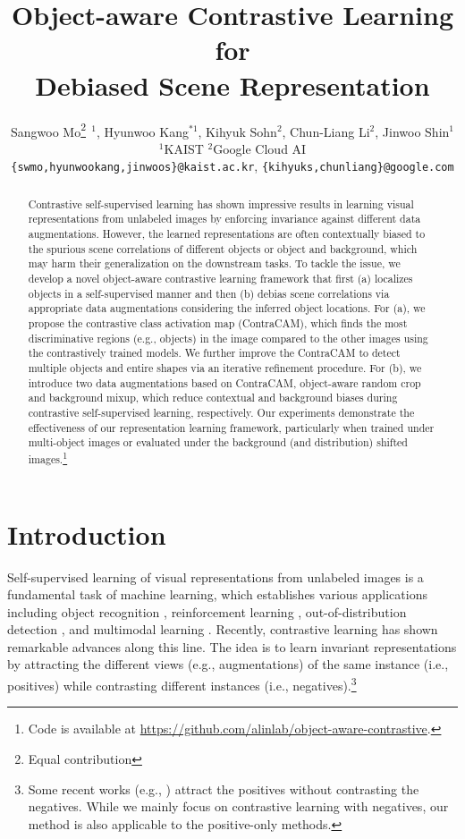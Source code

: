 \documentclass{article}
\title{
Object-aware Contrastive Learning for \\
Debiased Scene Representation
}
\author{%
Sangwoo Mo\thanks{Equal contribution}$\:\:^1$, Hyunwoo Kang$^{*1}$, Kihyuk Sohn$^2$, Chun-Liang Li$^2$, Jinwoo Shin$^1$\\
$^1$KAIST \quad $^2$Google Cloud AI\\
\texttt{\{swmo,hyunwookang,jinwoos\}@kaist.ac.kr}, \texttt{\{kihyuks,chunliang\}@google.com}
}
\begin{document}
\maketitle
  
\setcounter{footnote}{0}

\begin{abstract}
 Contrastive self-supervised learning has shown impressive results in learning visual representations from unlabeled images by enforcing invariance against different data augmentations. However, the learned representations are often contextually biased to the spurious scene correlations of different objects or object and background, which may harm their generalization on the downstream tasks. To tackle the issue, we develop a novel object-aware contrastive learning framework that first (a) localizes objects in a self-supervised manner and then (b) debias scene correlations via appropriate data augmentations considering the inferred object locations. For (a), we propose the contrastive class activation map (ContraCAM), which finds the most discriminative regions (e.g., objects) in the image compared to the other images using the contrastively trained models. We further improve the ContraCAM to detect multiple objects and entire shapes via an iterative refinement procedure. For (b), we introduce two data augmentations based on ContraCAM, object-aware random crop and background mixup, which reduce contextual and background biases during contrastive self-supervised learning, respectively. Our experiments demonstrate the effectiveness of our representation learning framework, particularly when trained under multi-object images or evaluated under the background (and distribution) shifted images.\footnote{Code is available at \url{https://github.com/alinlab/object-aware-contrastive}.}
\end{abstract}


\section{Introduction}
\label{sec:intro}

Self-supervised learning of visual representations from unlabeled images is a fundamental task of machine learning, which establishes various applications including object recognition \citep{he2020momentum,chen2020simple}, reinforcement learning \citep{anand2019unsupervised,srinivas2020curl}, out-of-distribution detection \citep{tack2020csi,sohn2021learning}, and multimodal learning \citep{radford2021learning,afouras2021self}. Recently, contrastive learning \citep{oord2018representation,wu2018unsupervised,misra2020self,he2020momentum,chen2020simple,caron2020unsupervised,tian2020contrastive,grill2020bootstrap,chen2021exploring} has shown remarkable advances along this line. The idea is to learn invariant representations by attracting the different views (e.g., augmentations) of the same instance (i.e., positives) while contrasting different instances (i.e., negatives).\footnote{Some recent works (e.g., \citep{grill2020bootstrap,chen2021exploring}) attract the positives without contrasting the negatives. While we mainly focus on contrastive learning with negatives, our method is also applicable to the positive-only methods.}
\end{document}
